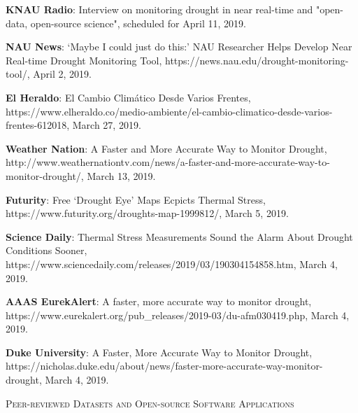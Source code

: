 \documentclass[10pt]{article}
\newenvironment{changemargin}[2]{%
  \begin{list}{}{%
    \setlength{\topsep}{0pt}%
    \setlength{\leftmargin}{#1}%
    \setlength{\rightmargin}{#2}%
    \setlength{\listparindent}{\parindent}%
    \setlength{\itemindent}{\parindent}%
    \setlength{\parsep}{\parskip}%
  }%
  \item[]}{\end{list}
}
\newcommand{\lineover}{
	\begin{changemargin}{-0.05in}{-0.05in}
		\vspace*{-8pt}
		\hrulefill \\
		\vspace*{-2pt}
	\end{changemargin}
}
\newcommand{\header}[1]{
	\begin{changemargin}{-0.5in}{-0.5in}
		\scshape{#1}\\
  	\lineover
	\end{changemargin}
}
\newenvironment{body} {
	\vspace*{-2pt}
	\begin{changemargin}{-0.5in}{-0.5in}
  }
	{\end{changemargin}
}
\begin{document}
\begin{body}
\textbf{KNAU Radio}: Interview on monitoring drought in near real-time and "open-data, open-source science", scheduled for April 11, 2019.\\ \medskip

\textbf{NAU News}: ‘Maybe I could just do this:’ NAU Researcher Helps Develop Near Real-time Drought Monitoring Tool, https://news.nau.edu/drought-monitoring-tool/, April 2, 2019.\\ \medskip
  		
\textbf{El Heraldo}: El Cambio Climático Desde Varios Frentes, https://www.elheraldo.co/medio-ambiente/el-cambio-climatico-desde-varios-frentes-612018, March 27, 2019.\\ \medskip
  		
\textbf{Weather Nation}: A Faster and More Accurate Way to Monitor Drought, http://www.weathernationtv.com/news/a-faster-and-more-accurate-way-to-monitor-drought/, March 13, 2019.\\ \medskip

\textbf{Futurity}: Free ‘Drought Eye’ Maps Ecpicts Thermal Stress, https://www.futurity.org/droughts-map-1999812/, March 5, 2019.\\ \medskip
  		
\textbf{Science Daily}: Thermal Stress Measurements Sound the Alarm About Drought Conditions Sooner, https://www.sciencedaily.com/releases/2019/03/190304154858.htm, March 4, 2019.\\ \medskip
      
\textbf{AAAS EurekAlert}: A faster, more accurate way to monitor drought, https://www.eurekalert.org/pub\_releases/2019-03/du-afm030419.php, March 4, 2019.\\ \medskip

\textbf{Duke University}: A Faster, More Accurate Way to Monitor Drought, https://nicholas.duke.edu/about/news/faster-more-accurate-way-monitor-drought, March 4, 2019.\\ \medskip

\medskip
\end{body}

\medskip

	
\header{Peer-reviewed Datasets and Open-source Software Applications}
\end{document}
